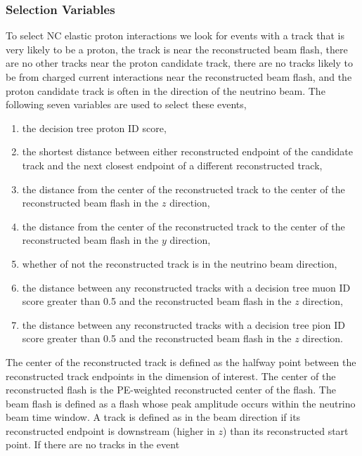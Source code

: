   \subsubsection{Selection Variables}\label{sec:selectionvars}
    To select NC elastic proton interactions we look for events with a track
    that is very likely to be a proton, the track is near the reconstructed
    beam flash, there are no other tracks near the proton candidate track,
    there are no tracks likely to be from charged current interactions near the
    reconstructed beam flash, and the proton candidate track is often in the
    direction of the neutrino beam. The following seven variables are used to
    select these events,
    \begin{enumerate}
      \item the decision tree proton ID score,
      \item the shortest distance between either reconstructed endpoint of the
      candidate track and the next closest endpoint of a different
      reconstructed track,
      \item the distance from the center of the reconstructed track to the
      center of the reconstructed beam flash in the $z$ direction,
      \item the distance from the center of the reconstructed track to the
      center of the reconstructed beam flash in the $y$ direction,
      \item whether of not the reconstructed track is in the neutrino beam
      direction,
      \item the distance between any reconstructed tracks with a decision tree
      muon ID score greater than 0.5 and the reconstructed beam flash in the
      $z$ direction,
      \item the distance between any reconstructed tracks with a decision tree
      pion ID score greater than 0.5 and the reconstructed beam flash in the
      $z$ direction.
    \end{enumerate}
    The center of the reconstructed track is defined as the halfway point
    between the reconstructed track endpoints in the dimension of interest. The
    center of the reconstructed flash is the PE-weighted reconstructed center
    of the flash. The beam flash is defined as a flash whose peak amplitude
    occurs within the neutrino beam time window. A track is defined as in the
    beam direction if its reconstructed endpoint is downstream (higher in $z$)
    than its reconstructed start point. If there are no tracks in the event
